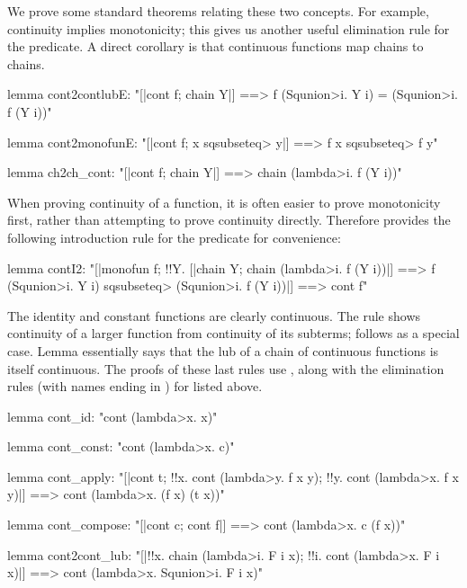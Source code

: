 \noindent
We prove some standard theorems relating these two concepts. For example, continuity implies monotonicity; this gives us another useful elimination rule for the  predicate. A direct corollary is that continuous functions map chains to chains.

\begin{isacode}
lemma cont2contlubE:
  "[|cont f; chain Y|] ==> f (\<Squnion>i. Y i) = (\<Squnion>i. f (Y i))"
\end{isacode}
\unmedskip
{}
\begin{isacode}
lemma cont2monofunE:
  "[|cont f; x \<sqsubseteq> y|] ==> f x \<sqsubseteq> f y"
\end{isacode}
\unmedskip
{}
\begin{isacode}
lemma ch2ch_cont:
  "[|cont f; chain Y|] ==> chain (\<lambda>i. f (Y i))"
\end{isacode}

\noindent
When proving continuity of a function, it is often easier to prove monotonicity first, rather than attempting to prove continuity directly. Therefore  provides the following introduction rule for the  predicate for convenience:

\begin{isacode}
lemma contI2:
  "[|monofun f; !!Y. [|chain Y; chain (\<lambda>i. f (Y i))|] ==> f (\<Squnion>i. Y i) \<sqsubseteq> (\<Squnion>i. f (Y i))|]
    ==> cont f"
\end{isacode}

\noindent
The identity and constant functions are clearly continuous. The rule  shows continuity of a larger function from continuity of its subterms;  follows as a special case. Lemma  essentially says that the lub of a chain of continuous functions is itself continuous. The proofs of these last rules use , along with the elimination rules (with names ending in ) for  listed above.

\begin{isacode}
lemma cont_id: "cont (\<lambda>x. x)"
\end{isacode}
\unmedskip
{}
\begin{isacode}
lemma cont_const: "cont (\<lambda>x. c)"
\end{isacode}
\unmedskip
{}
\begin{isacode}
lemma cont_apply:
  "[|cont t; !!x. cont (\<lambda>y. f x y); !!y. cont (\<lambda>x. f x y)|] ==> cont (\<lambda>x. (f x) (t x))"
\end{isacode}
\unmedskip
{}
\begin{isacode}
lemma cont_compose:
  "[|cont c; cont f|] ==> cont (\<lambda>x. c (f x))"
\end{isacode}
\unmedskip
{}
\begin{isacode}
lemma cont2cont_lub:
  "[|!!x. chain (\<lambda>i. F i x); !!i. cont (\<lambda>x. F i x)|] ==> cont (\<lambda>x. \<Squnion>i. F i x)"
\end{isacode}

